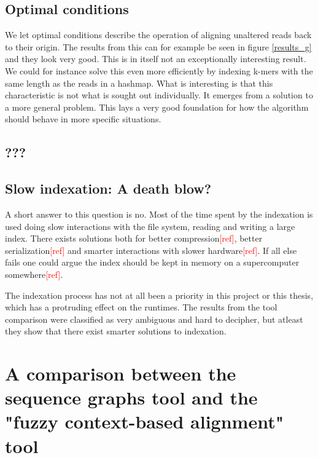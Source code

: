 \documentclass[thesis.tex]{subfiles}
\begin{document}
\subsection{Optimal conditions}
We let optimal conditions describe the operation of aligning unaltered reads back to their origin. The results from this can for example be seen in figure \ref{results_g} and they look very good. This is in itself not an exceptionally interesting result. We could for instance solve this even more efficiently by indexing k-mers with the same length as the reads in a hashmap. What is interesting is that this characteristic is not what is sought out individually. It emerges from a solution to a more general problem. This lays a very good foundation for how the algorithm should behave in more specific situations. 
\subsection{???}
\subsection{Slow indexation: A death blow?}
A short answer to this question is no. Most of the time spent by the indexation is used doing slow interactions with the file system, reading and writing a large index. There exists solutions both for better compression\textcolor{red}{[ref]}, better serialization\textcolor{red}{[ref]} and smarter interactions with slower hardware\textcolor{red}{[ref]}. If all else fails one could argue the index should be kept in memory on a supercomputer somewhere\textcolor{red}{[ref]}.\\
\par\noindent
The indexation process has not at all been a priority in this project or this thesis, which has a protruding effect on the runtimes. The results from the tool comparison were classified as very ambiguous and hard to decipher, but atleast they show that there exist smarter solutions to indexation.
\section{A comparison between the sequence graphs tool and the "fuzzy context-based alignment" tool}
\end{document}
